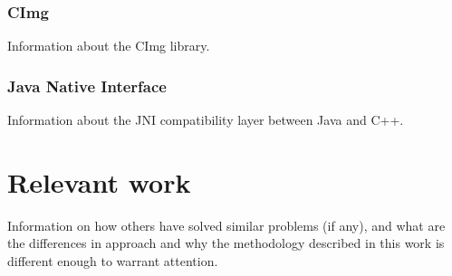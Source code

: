 \documentclass [12pt,a4paper]{report}
\begin{document}
\subsection{CImg}
Information about the CImg library. \cite{website:cimg}
\subsection{Java Native Interface}
Information about the JNI compatibility layer between Java and C++.

\chapter{Relevant work}
Information on how others have solved similar problems (if any), and what are the differences in approach and why the methodology described in this work is different enough to warrant attention.
\end{document}
